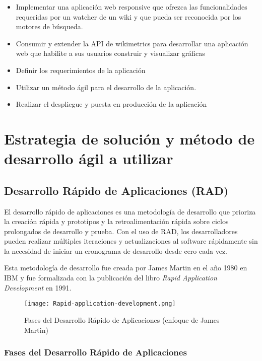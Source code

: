 \begin{itemize}
    \item Implementar una aplicación web responsive que ofrezca las funcionalidades requeridas por un watcher de un wiki y que pueda ser reconocida por los motores de búsqueda.
    \item Consumir y extender la API de wikimetrics para desarrollar una aplicación web que habilite a sus usuarios construir y visualizar gráficas
    \item Definir los requerimientos de la aplicación
    \item Utilizar un método ágil para el desarrollo de la aplicación.
    \item Realizar el despliegue y puesta en producción de la aplicación
\end{itemize}

\section{Estrategia de solución y método de desarrollo ágil a utilizar}

\subsection{Desarrollo Rápido de Aplicaciones (RAD)}


El desarrollo rápido de aplicaciones es una metodología de desarrollo que prioriza la creación rápida y prototipos y la retroalimentación rápida sobre ciclos prolongados de desarrollo y prueba. Con el uso de RAD, los desarrolladores pueden realizar múltiples iteraciones y actualizaciones al software rápidamente sin la necesidad de iniciar un cronograma de desarrollo desde cero cada vez.

Esta metodología de desarrollo fue creada por James Martin en el año 1980 en IBM y fue formalizada con la publicación del libro \emph{Rapid Application Development} en 1991.

\begin{figure}[H]
    \centering
    \texttt{[image: Rapid-application-development.png]}
    \caption{Fases del Desarrollo Rápido de Aplicaciones (enfoque de James Martin)}
    \label{fig:Rapid-application-development}
\end{figure}

\subsubsection{Fases del Desarrollo Rápido de Aplicaciones}

